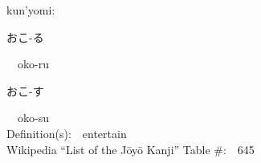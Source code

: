 \begin{multicols}{2}
{\hspace*{1em}}kun'yomi:\ \ \\
{\hspace*{2em}}{\begin{CJK}{UTF8}{min} おこ-る \end{CJK}}\ \ oko-ru\ \ \\
{\hspace*{2em}}{\begin{CJK}{UTF8}{min} おこ-す \end{CJK}}\ \ oko-su\ \ \\
Definition(s):\ \ entertain \\
Wikipedia ``List of the J\=oy\=o Kanji'' Table \#:\ \ 645 \\
\ \ \\
\end{multicols}



